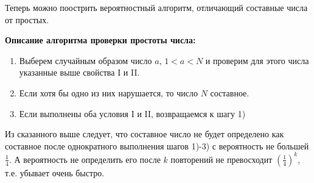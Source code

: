 \begin{problem}
Теперь можно поострить вероятностный алгоритм, отличающий составные числа от простых.

\textbf{Описание алгоритма проверки простоты числа:}

\begin{enumerate}
\item \textbf{ }Выберем случайным образом число $a$, $1<a<N$ и проверим для этого числа указанные выше свойства I и II.

\item  Если хотя бы одно из них нарушается, то число $N$ составное.

\item  Если выполнены оба условия I и II, возвращаемся к шагу 1)
\end{enumerate}

\noindent Из сказанного выше следует, что составное число не будет определено как составное после однократного выполнения шагов 1)-3) с вероятность не большей $\frac{1}{4} $. А вероятность не определить его после $k$ повторений не превосходит $\left(\frac{1}{4} \right)^{k} $, т.е. убывает очень быстро.


\end{problem}

